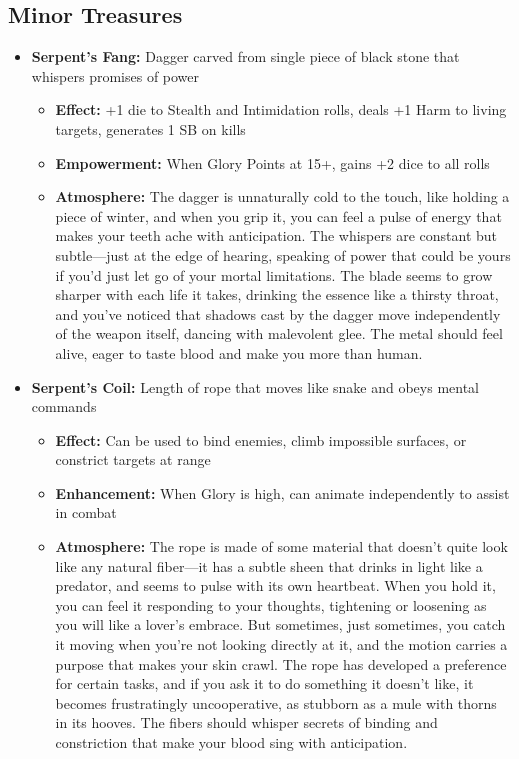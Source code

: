 \documentclass[11pt]{article}
\begin{document}
\subsection{Minor Treasures}
\begin{itemize}
\item \textbf{Serpent's Fang:} Dagger carved from single piece of black stone that whispers promises of power
  \begin{itemize}
  \item \textbf{Effect:} +1 die to Stealth and Intimidation rolls, deals +1 Harm to living targets, generates 1 SB on kills
  \item \textbf{Empowerment:} When Glory Points at 15+, gains +2 dice to all rolls
  \item \textbf{Atmosphere:} The dagger is unnaturally cold to the touch, like holding a piece of winter, and when you grip it, you can feel a pulse of energy that makes your teeth ache with anticipation. The whispers are constant but subtle—just at the edge of hearing, speaking of power that could be yours if you'd just let go of your mortal limitations. The blade seems to grow sharper with each life it takes, drinking the essence like a thirsty throat, and you've noticed that shadows cast by the dagger move independently of the weapon itself, dancing with malevolent glee. The metal should feel alive, eager to taste blood and make you more than human.
  \end{itemize}
\item \textbf{Serpent's Coil:} Length of rope that moves like snake and obeys mental commands
  \begin{itemize}
  \item \textbf{Effect:} Can be used to bind enemies, climb impossible surfaces, or constrict targets at range
  \item \textbf{Enhancement:} When Glory is high, can animate independently to assist in combat
  \item \textbf{Atmosphere:} The rope is made of some material that doesn't quite look like any natural fiber—it has a subtle sheen that drinks in light like a predator, and seems to pulse with its own heartbeat. When you hold it, you can feel it responding to your thoughts, tightening or loosening as you will like a lover's embrace. But sometimes, just sometimes, you catch it moving when you're not looking directly at it, and the motion carries a purpose that makes your skin crawl. The rope has developed a preference for certain tasks, and if you ask it to do something it doesn't like, it becomes frustratingly uncooperative, as stubborn as a mule with thorns in its hooves. The fibers should whisper secrets of binding and constriction that make your blood sing with anticipation.
  \end{itemize}
\end{itemize}
\end{document}
